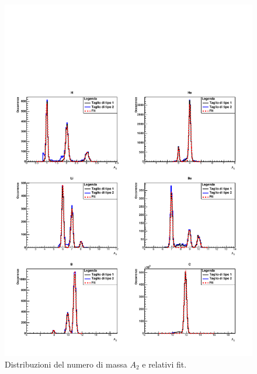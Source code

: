 \documentclass[12pt,a4paper,twoside]{report}
\begin{document}
	\begin{figure}[H]
		\centering
		\includegraphics[width=1.02\linewidth,center]{c_Total_black_blue2.pdf}
		\caption{Distribuzioni del numero di massa $A_2$ e relativi fit.}
		\label{fig:a2_fragments_final}
	\end{figure}
\end{document}
